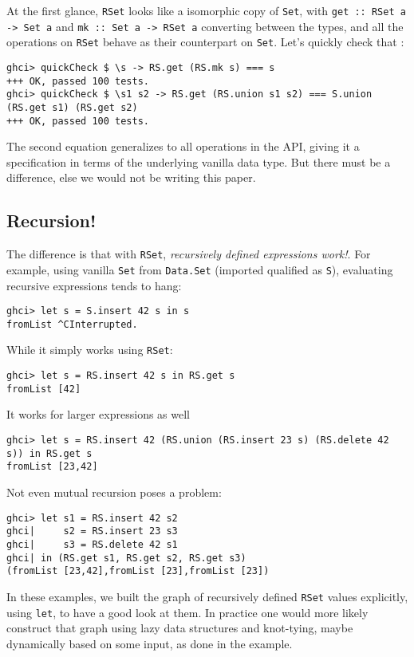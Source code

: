 \documentclass[manuscript,screen,acmsmall]{acmart}
\begin{document}
At the first glance, \verb|RSet| looks like a isomorphic copy of \verb|Set|, with \verb|get :: RSet a -> Set a| and \verb|mk :: Set a -> RSet a| converting between the types, and all the operations on \verb|RSet| behave as their counterpart on \verb|Set|. Let's quickly check that \citep{quickcheck}:
\begin{verbatim}
ghci> quickCheck $ \s -> RS.get (RS.mk s) === s
+++ OK, passed 100 tests.
ghci> quickCheck $ \s1 s2 -> RS.get (RS.union s1 s2) === S.union (RS.get s1) (RS.get s2)
+++ OK, passed 100 tests.
\end{verbatim}

The second equation generalizes to all operations in the API, giving it a specification in terms of the underlying vanilla data type. But there must be a difference, else we would not be writing this paper.

\subsection{Recursion!}

The difference is that with \verb|RSet|, \emph{recursively defined expressions work!}. For example, using vanilla \verb|Set| from \verb|Data.Set| (imported qualified as \verb|S|), evaluating recursive expressions tends to hang:
\begin{verbatim}
ghci> let s = S.insert 42 s in s
fromList ^CInterrupted.
\end{verbatim}
While it simply works using  \verb|RSet|:
\begin{verbatim}
ghci> let s = RS.insert 42 s in RS.get s
fromList [42]
\end{verbatim}
It works for larger expressions as well
\begin{verbatim}
ghci> let s = RS.insert 42 (RS.union (RS.insert 23 s) (RS.delete 42 s)) in RS.get s
fromList [23,42]
\end{verbatim}
Not even mutual recursion poses a problem:
\begin{verbatim}
ghci> let s1 = RS.insert 42 s2
ghci|     s2 = RS.insert 23 s3
ghci|     s3 = RS.delete 42 s1
ghci| in (RS.get s1, RS.get s2, RS.get s3)
(fromList [23,42],fromList [23],fromList [23])
\end{verbatim}

In these examples, we built the graph of recursively defined \verb|RSet| values explicitly, using \verb|let|, to have a good look at them. In practice one would more likely construct that graph using lazy data structures and knot-tying, maybe dynamically based on some input, as done in the example.
\end{document}
